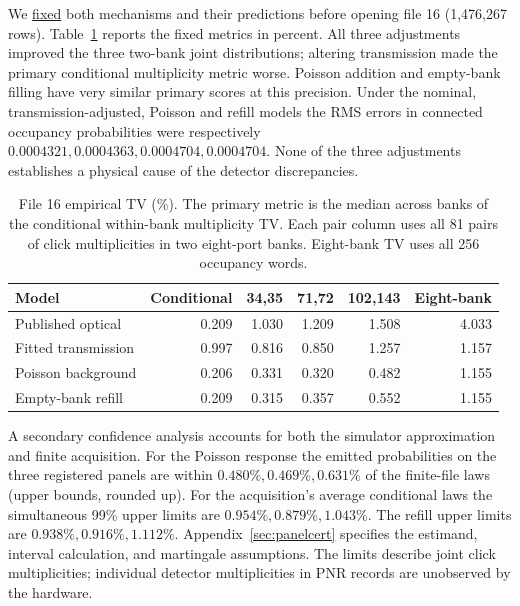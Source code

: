 \documentclass[11pt]{article}
\begin{document}
We \href{https://github.com/qiyuanhuakai/deziroGBS/tree/b935454181ef17a42962e78b226d367b8ec07b16/results/iteration120_contractions}{fixed} both mechanisms and their predictions before opening file 16 (1,476,267 rows). Table~\ref{tab:response} reports the fixed metrics in percent. All three adjustments improved the three two-bank joint distributions; altering transmission made the primary conditional multiplicity metric worse. Poisson addition and empty-bank filling have very similar primary scores at this precision. Under the nominal, transmission-adjusted, Poisson and refill models the RMS errors in connected occupancy probabilities were respectively $0.0004321,0.0004363,0.0004704,0.0004704$. None of the three adjustments establishes a physical cause of the detector discrepancies.
\begin{table}[htbp]\centering\small
\caption{File 16 empirical TV (\%). The primary metric is the median across banks of the conditional within-bank multiplicity TV. Each pair column uses all 81 pairs of click multiplicities in two eight-port banks. Eight-bank TV uses all 256 occupancy words.}\label{tab:response}
\begin{tabular}{lrrrrr}\toprule
Model & Conditional & 34,35 & 71,72 & 102,143 & Eight-bank\\\midrule
Published optical &0.209&1.030&1.209&1.508&4.033\\
Fitted transmission &0.997&0.816&0.850&1.257&1.157\\
Poisson background &0.206&0.331&0.320&0.482&1.155\\
Empty-bank refill &0.209&0.315&0.357&0.552&1.155\\\bottomrule
\end{tabular}\end{table}

A secondary confidence analysis accounts for both the simulator approximation and finite acquisition. For the Poisson response the emitted probabilities on the three registered panels are within $0.480\%,0.469\%,0.631\%$ of the finite-file laws (upper bounds, rounded up). For the acquisition's average conditional laws the simultaneous 99\% upper limits are $0.954\%,0.879\%,1.043\%$. The refill upper limits are $0.938\%,0.916\%,1.112\%$. Appendix~\ref{sec:panelcert} specifies the estimand, interval calculation, and martingale assumptions. The limits describe joint click multiplicities; individual detector multiplicities in PNR records are unobserved by the hardware.
\end{document}

